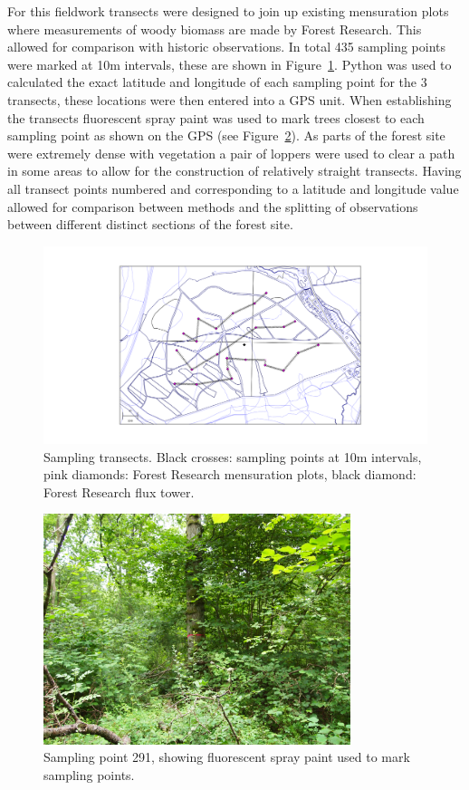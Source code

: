 For this fieldwork transects were designed to join up existing mensuration plots where measurements of woody biomass are made by Forest Research. This allowed for comparison with historic observations. In total 435 sampling points were marked at 10m intervals, these are shown in Figure~\ref{chap4:fig:transects}. Python was used to calculated the exact latitude and longitude of each sampling point for the 3 transects, these locations were then entered into a GPS unit. When establishing the transects fluorescent spray paint was used to mark trees closest to each sampling point as shown on the GPS (see Figure~\ref{chap4:fig:pink_tree}). As parts of the forest site were extremely dense with vegetation a pair of loppers were used to clear a path in some areas to allow for the construction of relatively straight transects. Having all transect points numbered and corresponding to a latitude and longitude value allowed for comparison between methods and the splitting of observations between different distinct sections of the forest site. 


\begin{figure}[ht]
    \centering
    \includegraphics[width=\textwidth]{chapter/chapter4/straitsmap_threet_10m.png}
    \caption{Sampling transects. Black crosses: sampling points at 10m intervals, pink diamonds: Forest Research mensuration plots, black diamond: Forest Research flux tower.} \label{chap4:fig:transects}
\end{figure}

\begin{figure}[ht]
    \centering
    \includegraphics[width=0.8\textwidth]{chapter/chapter4/291E.jpg}
    \caption{Sampling point 291, showing fluorescent spray paint used to mark sampling points.} \label{chap4:fig:pink_tree}
\end{figure}

